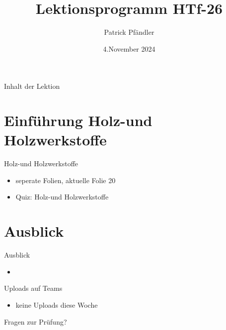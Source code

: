 

\title{\textbf{Lektionsprogramm HTf-26}}
\author{Patrick Pfändler}
\date{4.November 2024}




\frame{\titlepage}

\begin{frame}{Inhalt der Lektion}
    \tableofcontents
\end{frame}


\section{Einführung Holz-und Holzwerkstoffe}
\begin{frame}{Holz-und Holzwerkstoffe}
\begin{itemize}
	\item[\textbullet] seperate Folien, aktuelle Folie 20
	\item[\textbullet] Quiz: Holz-und Holzwerkstoffe
\end{itemize}	
\end{frame}
\section{Ausblick}

\begin{frame}{Ausblick}
	\begin{itemize}
		\item {}
	\end{itemize}
\end{frame}

\begin{frame}{Uploads auf Teams }
    \begin{itemize}
        \item[\textbullet] keine Uploads diese Woche
    \end{itemize}
    
\end{frame}

\begin{frame}{Fragen zur Prüfung?}
    
\end{frame}



